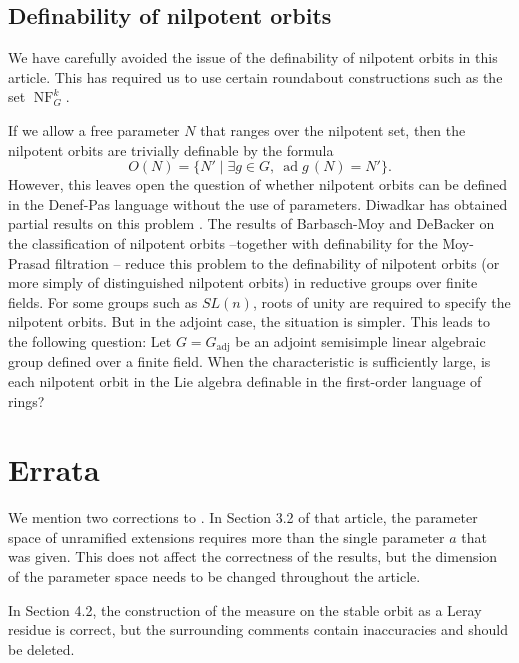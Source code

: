 \documentclass[12pt]{amsart}
\newcommand{\op}[1]{\operatorname{#1}}
\def\NF{\op{NF}}
\theoremstyle{plain}
\theoremstyle{definition}
\begin{document}
\subsection{Definability of nilpotent orbits}

We have carefully avoided the issue of the definability of nilpotent
orbits in this article.  This has required us to use certain roundabout
constructions such as the set $\NF^k_G$.

If we allow a free parameter $N$ that ranges over the nilpotent set,
then the nilpotent orbits are trivially definable by the formula
\[
O(N) = \{N' \mid \exists g\in G,~ \op{ad}g\,(N) = N' \}.
\]  
However, this leaves open the question of whether nilpotent orbits can
be defined in the Denef-Pas language without the use of parameters.
Diwadkar has obtained partial results on this problem
\cite{diwadkar2006nilpoten}.  The results of Barbasch-Moy and DeBacker
on the classification of nilpotent orbits --together with definability
for the Moy-Prasad filtration \cite{CGH} -- reduce this problem to the
definability of nilpotent orbits (or more simply of distinguished
nilpotent orbits) in reductive groups over finite fields.  For some
groups such as $SL(n)$, roots of unity are required to specify the
nilpotent orbits.  But in the adjoint case, the situation is
simpler. This leads to the following question: Let $G=G_{\text{adj}}$
be an adjoint semisimple linear algebraic group defined over a finite
field.  When the characteristic is sufficiently large, is each
nilpotent orbit in the Lie algebra definable in the first-order
language of rings?

\section{Errata}

We mention two corrections to \cite{CHL}.  In Section 3.2 of that
article, the parameter space of unramified extensions requires more
than the single parameter $a$ that was given.  This does not affect
the correctness of the results, but the dimension of the parameter
space needs to be changed throughout the article.

In Section 4.2, the construction of the measure on the stable orbit as
a Leray residue is correct, but the surrounding comments contain
inaccuracies and should be deleted.






\end{document}

